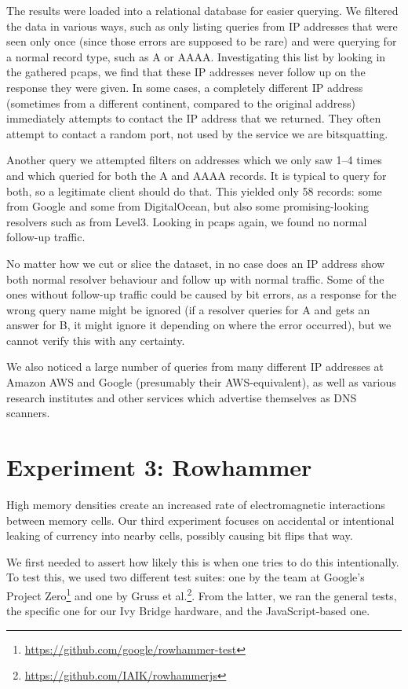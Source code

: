 \documentclass[conference]{IEEEtran}
\begin{document}
The results were loaded into a relational database for easier querying. We
filtered the data in various ways, such as only listing queries from IP
addresses that were seen only once (since those errors are supposed to be rare)
and were querying for a normal record type, such as A or AAAA. Investigating
this list by looking in the gathered pcaps, we find that these IP addresses
never follow up on the response they were given. In some cases, a completely
different IP address (sometimes from a different continent, compared to the
original address) immediately attempts to contact the IP address that we
returned. They often attempt to contact a random port, not used by the service
we are bitsquatting.

Another query we attempted filters on addresses which we only saw 1--4 times
and which queried for both the A and AAAA records. It is typical to query for
both, so a legitimate client should do that. This yielded only 58 records: some
from Google and some from DigitalOcean, but also some promising-looking
resolvers such as from Level3. Looking in pcaps again, we found no normal
follow-up traffic.

No matter how we cut or slice the dataset, in no case does an IP address show
both normal resolver behaviour and follow up with normal traffic. Some of the
ones without follow-up traffic could be caused by bit errors, as a response for
the wrong query name might be ignored (if a resolver queries for A and gets an
answer for B, it might ignore it depending on where the error occurred), but
we cannot verify this with any certainty.

We also noticed a large number of queries from many different IP addresses at
Amazon AWS and Google (presumably their AWS-equivalent), as well as various
research institutes and other services which advertise themselves as DNS
scanners.



\section{Experiment 3: Rowhammer}

High memory densities create an increased rate of electromagnetic interactions
between memory cells\cite{kim2014flipping}. Our third experiment focuses on
accidental or intentional leaking of currency into nearby cells, possibly
causing bit flips that way.

We first needed to assert how likely this is when one tries to do this
intentionally. To test this, we used two different test suites: one by the team
at Google's Project
Zero\footnote{\url{https://github.com/google/rowhammer-test}} and one by Gruss
et
al.\cite{gruss2016rowhammer}\footnote{\url{https://github.com/IAIK/rowhammerjs}}.
From the latter, we ran the general tests, the specific one for our Ivy Bridge
hardware, and the JavaScript-based one.
\end{document}
